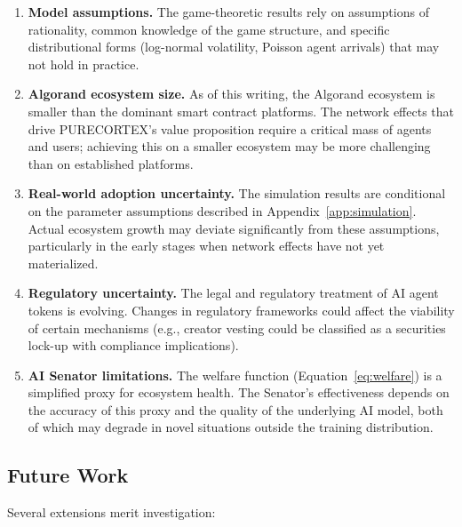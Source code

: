\begin{enumerate}
  \item \textbf{Model assumptions.} The game-theoretic results rely on
    assumptions of rationality, common knowledge of the game structure, and
    specific distributional forms (log-normal volatility, Poisson agent
    arrivals) that may not hold in practice.

  \item \textbf{Algorand ecosystem size.} As of this writing, the Algorand
    ecosystem is smaller than the dominant smart contract platforms. The
    network effects that drive PURECORTEX's value proposition require a
    critical mass of agents and users; achieving this on a smaller ecosystem
    may be more challenging than on established platforms.

  \item \textbf{Real-world adoption uncertainty.} The simulation results are
    conditional on the parameter assumptions described in
    Appendix~\ref{app:simulation}. Actual ecosystem growth may deviate
    significantly from these assumptions, particularly in the early stages
    when network effects have not yet materialized.

  \item \textbf{Regulatory uncertainty.} The legal and regulatory treatment of
    AI agent tokens is evolving. Changes in regulatory frameworks could
    affect the viability of certain mechanisms (e.g., creator vesting could
    be classified as a securities lock-up with compliance implications).

  \item \textbf{AI Senator limitations.} The welfare function
    (Equation~\eqref{eq:welfare}) is a simplified proxy for ecosystem health.
    The Senator's effectiveness depends on the accuracy of this proxy and the
    quality of the underlying AI model, both of which may degrade in novel
    situations outside the training distribution.
\end{enumerate}

\subsection{Future Work}
\label{subsec:future-work}

Several extensions merit investigation:

